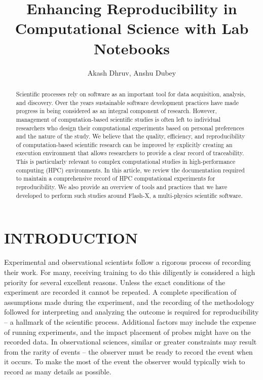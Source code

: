 \documentclass{IEEEcsmag}
\begin{document}
\title{Enhancing Reproducibility in Computational Science with Lab Notebooks}
   
\author{ Akash Dhruv, Anshu Dubey}


\begin{abstract}
%
Scientific processes rely on software as an important tool for data acquisition, analysis, and discovery. Over the years sustainable software development practices have made progress in being considered as an integral component of research. However, management of computation-based scientific studies is often left to individual researchers who design their computational experiments based on personal preferences and the nature of the study. We believe that the quality, efficiency, and reproducibility of computation-based scientific research can be improved by explicitly creating an execution environment that allows researchers to provide a clear record of traceability. This is particularly relevant to complex computational studies in high-performance computing (HPC) environments. In this article, we review the documentation required to maintain a comprehensive record of  HPC computational experiments for reproducibility. We also provide an overview of tools and practices that we have developed to perform such studies around Flash-X, a multi-physics scientific software.

\end{abstract}

\maketitle

\section{INTRODUCTION}
Experimental and observational scientists follow a rigorous process of recording their work. For many, receiving training to do this diligently is considered a high priority for several excellent reasons. Unless the exact conditions of the experiment are recorded it cannot be repeated. A complete specification of assumptions made during the experiment, and the recording of the methodology followed for
interpreting and analyzing the outcome is required for
reproducibility -- a hallmark of the scientific
process. Additional factors may include the expense of running experiments, and the impact placement of probes might have on the recorded data.  In observational sciences, similar or greater constraints may result from the rarity of events -- the observer
must be ready to record the event when it occurs. To make the most of the event the observer would typically
wish to record as many details as possible.
\end{document}
